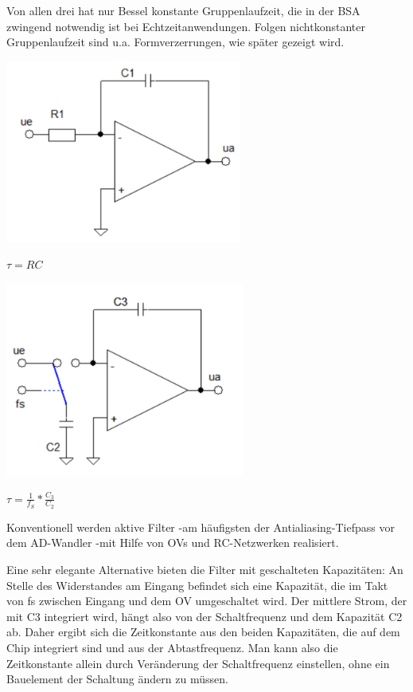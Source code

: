 \documentclass[a4paper]{article}
\begin{document}
\begin{multicols}{3}
\begin{itemize*}
\begin{itemize*}
    \end{itemize*}
    \item Von allen drei hat nur Bessel konstante Gruppenlaufzeit, die in der BSA zwingend notwendig ist bei Echtzeitanwendungen. Folgen nichtkonstanter Gruppenlaufzeit sind u.a. Formverzerrungen, wie später gezeigt wird.
    \item \includegraphics[width=.5\linewidth]{Assets/Biosignalverarbeitung-diskreter-integrator-mit-ov.png}
    \begin{itemize*}
      \item $\tau=RC$
    \end{itemize*}
    \item \includegraphics[width=.5\linewidth]{Assets/Biosignalverarbeitung-integrierter-integrator-mit-sc.png}
    \begin{itemize*}
      \item $\tau=\frac{1}{f_S}*\frac{C_3}{C_2}$
    \end{itemize*}
    \item Konventionell werden aktive Filter -am häufigsten der Antialiasing-Tiefpass vor dem AD-Wandler -mit Hilfe von OVs und RC-Netzwerken realisiert.
    \item Eine sehr elegante Alternative bieten die Filter mit geschalteten Kapazitäten: An Stelle des Widerstandes am Eingang befindet sich eine Kapazität, die im Takt von fs zwischen Eingang und dem OV umgeschaltet wird. Der mittlere Strom, der mit C3 integriert wird, hängt also von der Schaltfrequenz und dem Kapazität C2 ab. Daher ergibt sich die Zeitkonstante aus den beiden Kapazitäten, die auf dem Chip integriert sind und aus der Abtastfrequenz. Man kann also die Zeitkonstante allein durch Veränderung der Schaltfrequenz einstellen, ohne ein Bauelement der Schaltung ändern zu müssen.

\end{itemize*}
\end{multicols}
\end{document}
